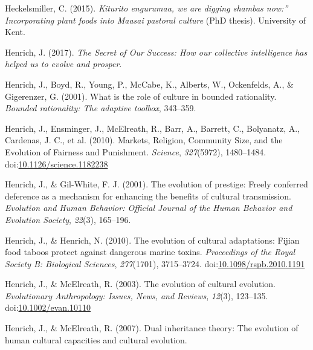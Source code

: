 \documentclass[
  11pt,
]{article}
\begin{document}
\leavevmode\hypertarget{ref-heckelsmillerKituritoEngurumaaWe2015}{}%
Heckelsmiller, C. (2015). \emph{Kiturito engurumaa, we are digging
shambas now:'' Incorporating plant foods into Maasai pastoral culture}
(PhD thesis). University of Kent.

\leavevmode\hypertarget{ref-henrichSecretOurSuccess2017}{}%
Henrich, J. (2017). \emph{The Secret of Our Success: How our collective
intelligence has helped us to evolve and prosper}.

\leavevmode\hypertarget{ref-henrich2001role}{}%
Henrich, J., Boyd, R., Young, P., McCabe, K., Alberts, W., Ockenfelds,
A., \& Gigerenzer, G. (2001). What is the role of culture in bounded
rationality. \emph{Bounded rationality: The adaptive toolbox}, 343--359.

\leavevmode\hypertarget{ref-henrichMarketsReligionCommunity2010}{}%
Henrich, J., Ensminger, J., McElreath, R., Barr, A., Barrett, C.,
Bolyanatz, A., Cardenas, J. C., et al. (2010). Markets, Religion,
Community Size, and the Evolution of Fairness and Punishment.
\emph{Science}, \emph{327}(5972), 1480--1484.
doi:\href{https://doi.org/10.1126/science.1182238}{10.1126/science.1182238}

\leavevmode\hypertarget{ref-henrichEvolutionPrestigeFreely2001a}{}%
Henrich, J., \& Gil-White, F. J. (2001). The evolution of prestige:
Freely conferred deference as a mechanism for enhancing the benefits of
cultural transmission. \emph{Evolution and Human Behavior: Official
Journal of the Human Behavior and Evolution Society}, \emph{22}(3),
165--196.

\leavevmode\hypertarget{ref-henrichEvolutionCulturalAdaptations2010}{}%
Henrich, J., \& Henrich, N. (2010). The evolution of cultural
adaptations: Fijian food taboos protect against dangerous marine toxins.
\emph{Proceedings of the Royal Society B: Biological Sciences},
\emph{277}(1701), 3715--3724.
doi:\href{https://doi.org/10.1098/rspb.2010.1191}{10.1098/rspb.2010.1191}

\leavevmode\hypertarget{ref-henrichEvolutionCulturalEvolution2003}{}%
Henrich, J., \& McElreath, R. (2003). The evolution of cultural
evolution. \emph{Evolutionary Anthropology: Issues, News, and Reviews},
\emph{12}(3), 123--135.
doi:\href{https://doi.org/10.1002/evan.10110}{10.1002/evan.10110}

\leavevmode\hypertarget{ref-henrich2007dual}{}%
Henrich, J., \& McElreath, R. (2007). Dual inheritance theory: The
evolution of human cultural capacities and cultural evolution.
\end{document}
